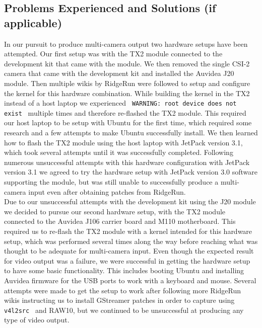 \documentclass[letterpaper,10pt,serif,draftclsnofoot,onecolumn,compsoc,titlepage]{IEEEtran}
\begin{document}
\subsection{Problems Experienced and Solutions (if applicable)}

In our pursuit to produce multi-camera output two hardware setups have been attempted. 
Our first 
setup was with the TX2 module connected to the development kit that came with the module. 
We then removed the single CSI-2 camera that came with the development kit and installed 
the Auvidea J20 module. Then multiple wikis by RidgeRun were followed to setup 
and configure 
the kernel for this hardware combination. While building the kernel in the TX2 instead of 
a host laptop we experienced \texttt{ WARNING: root device  does not exist } multiple times
and therefore re-flashed the TX2 module. This required our host laptop to be setup with 
Ubuntu for the first time, which required some research and a few attempts to make Ubuntu 
successfully install. We then learned how to flash the TX2 module using the host laptop 
with JetPack version 3.1, which took several attempts until it was successfully completed. 
Following numerous unsuccessful attempts with this hardware configuration with JetPack 
version 3.1 we agreed to try the hardware setup with JetPack version 3.0 software 
supporting the module, but was still unable to successfully produce a multi-camera input 
even after obtaining patches from RidgeRun. \\

Due to our unsuccessful attempts with the development kit using the J20 module we decided 
to pursue our second hardware setup, with the TX2 module 
connected to the Auvidea J106 carrier board and M110 motherboard. This required us to 
re-flash the TX2 module with a kernel intended for this hardware setup, which 
was performed several times along the way before reaching 
what was thought to be adequate for multi-camera input. Even though the expected result 
for video output was 
a failure, we were successful in getting the hardware setup to have some basic 
functionality. This includes booting Ubuntu and installing Auvidea firmware for the USB 
ports to work with a keyboard and mouse. Several attempts were made to get the setup to
work after following more RidgeRun wikis instructing us to install GStreamer patches 
in order to capture 
using \texttt{ v4l2src } and RAW10, but we continued to be unsuccessful at producing any type 
of video output. \\
\end{document}
